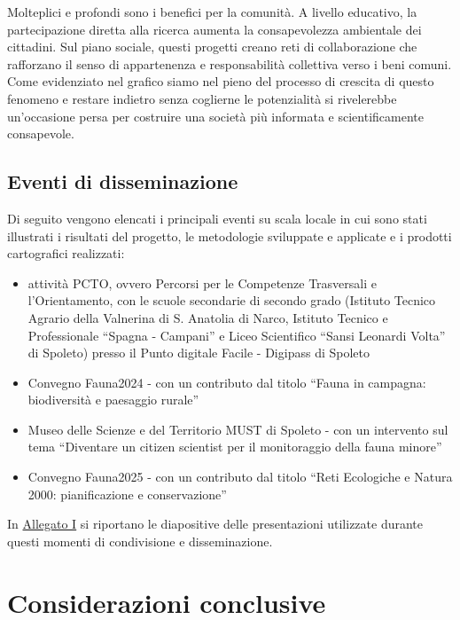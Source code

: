 \documentclass[
  a4paper,
]{book}
\providecommand{\tightlist}{%
  \setlength{\itemsep}{0pt}\setlength{\parskip}{0pt}}
\begin{document}
Molteplici e profondi sono i benefici per la comunità. A livello educativo, la partecipazione diretta alla ricerca aumenta la consapevolezza ambientale dei cittadini. Sul piano sociale, questi progetti creano reti di collaborazione che rafforzano il senso di appartenenza e responsabilità collettiva verso i beni comuni. Come evidenziato nel grafico siamo nel pieno del processo di crescita di questo fenomeno e restare indietro senza coglierne le potenzialità si rivelerebbe un'occasione persa per costruire una società più informata e scientificamente consapevole.

\section{Eventi di disseminazione}\label{eventi-di-disseminazione}

Di seguito vengono elencati i principali eventi su scala locale in cui sono stati illustrati i risultati del progetto, le metodologie sviluppate e applicate e i prodotti cartografici realizzati:

\begin{itemize}
\tightlist
\item
  attività PCTO, ovvero Percorsi per le Competenze Trasversali e l'Orientamento, con le scuole secondarie di secondo grado (Istituto Tecnico Agrario della Valnerina di S. Anatolia di Narco, Istituto Tecnico e Professionale ``Spagna - Campani'' e Liceo Scientifico ``Sansi Leonardi Volta'' di Spoleto) presso il Punto digitale Facile - Digipass di Spoleto
\item
  Convegno Fauna2024 - con un contributo dal titolo ``Fauna in campagna: biodiversità e paesaggio rurale''
\item
  Museo delle Scienze e del Territorio MUST di Spoleto - con un intervento sul tema ``Diventare un citizen scientist per il monitoraggio della fauna minore''
\item
  Convegno Fauna2025 - con un contributo dal titolo ``Reti Ecologiche e Natura 2000: pianificazione e conservazione''
\end{itemize}

In \hyperref[annexI]{Allegato I} si riportano le diapositive delle presentazioni utilizzate durante questi momenti di condivisione e disseminazione.

\chapter{Considerazioni conclusive}\label{considerazioni-conclusive}
\end{document}
